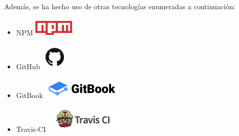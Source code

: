 Además, se ha hecho uso de otras tecnologías enumeradas a continuación:
\begin{itemize}
  \item NPM            \includegraphics[width=0.15\textwidth]{images/npm}
  \item GitHub         \includegraphics[width=0.1\textwidth]{images/github}
  \item GitBook        \includegraphics[width=0.3\textwidth]{images/gitbook}
  \item Travis-CI      \includegraphics[width=0.3\textwidth]{images/travis-ci-logo}
\end{itemize}